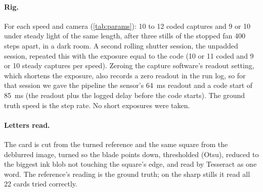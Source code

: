 \paragraph{Rig.} For each speed and camera (\cref{tab:params}): 10 to 12 coded captures and 9 or 10
under steady light of the same length, after three stills of the stopped fan 400 steps apart, in a
dark room. A second rolling shutter session, the unpadded session, repeated this with the exposure equal to the code (10 or 11 coded and 9 or 10 steady captures per speed). Zeroing the capture software's readout setting, which shortens the exposure, also records a zero readout in the run log, so for that session we gave the pipeline the sensor's \SI{64}{ms} readout and a code start of \SI{85}{ms} (the readout plus the logged delay before the code starts). The ground truth speed is the step rate. No short exposures were taken. 

\paragraph{Letters read.} The card is cut from the turned reference and the same square from the
deblurred image, turned so the blade points down, thresholded (Otsu), reduced to the biggest ink blob
not touching the square's edge, and read by Tesseract as one word. The reference's reading is the
ground truth; on the sharp stills it read all 22 cards tried correctly.
